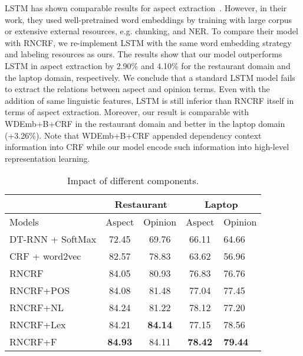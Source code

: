 \documentclass[11pt,letterpaper]{article}
\begin{document}
LSTM has shown comparable results for aspect extraction~\cite{liu15}. However, in their work, they used well-pretrained word embeddings by training with large corpus or extensive external resources, e.g. chunking, and NER. To compare their model with RNCRF, we re-implement LSTM with the same word embedding strategy and labeling resources as ours. The results show that our model outperforms LSTM in aspect extraction by 2.90\% and 4.10\% for the restaurant domain and the laptop domain, respectively. We conclude that a standard LSTM model fails to extract the relations between aspect and opinion terms. Even with the addition of same linguistic features, LSTM is still inferior than RNCRF itself in terms of aspect extraction. Moreover, our result is comparable with WDEmb+B+CRF in the restaurant domain and better in the laptop domain (+3.26\%). Note that WDEmb+B+CRF appended dependency context information into CRF while our model encode such information into high-level representation learning.

\begin{table}[t]
\footnotesize
	\begin{center}
		\begin{tabular}{l|c|c|c|p{1cm}}
			\hline
			\hline & \multicolumn{2}{c|}{Restaurant} & \multicolumn{2}{c}{Laptop} \\
			\hline Models & Aspect & Opinion & Aspect & Opinion \\
			\hline DT-RNN + SoftMax &
            \multirow{1}{*}{72.45} &
            \multirow{1}{*}{69.76} &
            \multirow{1}{*}{66.11} &
            \multirow{1}{*}{64.66} \\
			\hline CRF + word2vec &
            \multirow{1}{*}{82.57} &
            \multirow{1}{*}{78.83} &
            \multirow{1}{*}{63.62} &
            \multirow{1}{*}{56.96} \\
\hline RNCRF & 84.05 & 80.93 & 76.83 & 76.76 \\
			\hline RNCRF+POS & 84.08 & 81.48 & 77.04 & 77.45\\
			\hline RNCRF+NL & 84.24 & 81.22 & 78.12 & 77.20 \\
			\hline RNCRF+Lex & 84.21 & \bf{84.14} & 77.15 & 78.56\\
            \hline RNCRF+F & \bf{84.93} & 84.11 & \bf{78.42} & \bf{79.44} \\
			\hline
		\end{tabular}
		\caption{Impact of different components.}\label{tbl:RNCRF:components}
	\end{center}
\end{table}
\end{document}
